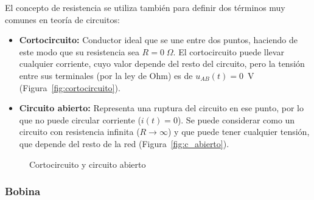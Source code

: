 	El concepto de resistencia se utiliza también para definir dos
        términos muy comunes en teoría de circuitos:
	\begin{itemize}
        \item \textbf{Cortocircuito:} Conductor ideal que se une entre
          dos puntos, haciendo de este modo que su resistencia sea
          $R=0\;\Omega$. El cortocircuito puede llevar cualquier
          corriente, cuyo valor depende del resto del circuito, pero
          la tensión entre sus terminales (por la ley de Ohm) es de
          $u_{AB}(t)=0$~V (Figura~\ref{fig:cortocircuito}).
        \item \textbf{Circuito abierto:} Representa una ruptura del
          circuito en ese punto, por lo que no puede circular
          corriente ($i(t)=0$). Se puede considerar como un circuito
          con resistencia infinita ($R\rightarrow\infty$) y que puede
          tener cualquier tensión, que depende del resto de la red
          (Figura~\ref{fig:c_abierto}).
	\end{itemize}
	\begin{figure}[H]
          \centering
          \hfil
          \caption{Cortocircuito y circuito abierto}
		
	\end{figure}
	
	\subsubsection{Bobina}\label{sec:bobina}
	
